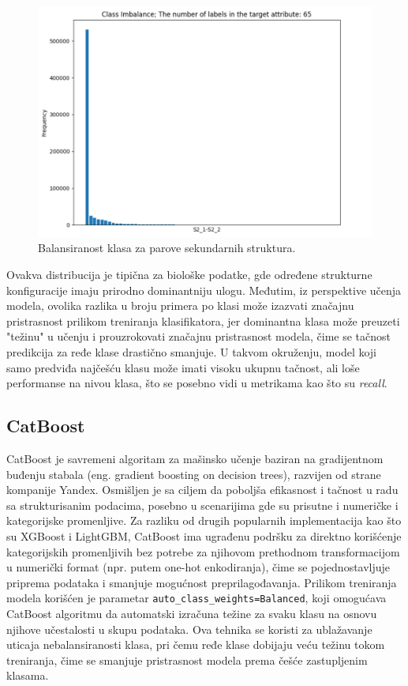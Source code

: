 \documentclass[a4paper,12pt]{article}
\begin{document}
\begin{figure}[htbp]
    \centering
    \includegraphics[width=1\textwidth]{./images/ss_imbalance.png}
    \caption{Balansiranost klasa za parove sekundarnih struktura.}
    \label{Slika:ss_imbalance}
\end{figure}
\newpage
Ovakva distribucija je tipična za biološke podatke, gde određene strukturne konfiguracije imaju prirodno dominantniju ulogu. Međutim, iz perspektive učenja modela, ovolika razlika u broju primera po klasi može izazvati značajnu pristrasnost prilikom treniranja klasifikatora, jer dominantna klasa može preuzeti "težinu" u učenju i prouzrokovati značajnu pristrasnost modela, čime se tačnost predikcija za ređe klase drastično smanjuje. U takvom okruženju, model koji samo predviđa najčešću klasu može imati visoku ukupnu tačnost, ali loše performanse na nivou klasa, što se posebno vidi u metrikama kao što su \textit{recall}.
\newpage

\subsection{CatBoost}

CatBoost je savremeni algoritam za mašinsko učenje baziran na gradijentnom buđenju stabala (eng. gradient boosting on decision trees), razvijen od strane kompanije Yandex. Osmišljen je sa ciljem da poboljša efikasnost i tačnost u radu sa strukturisanim podacima, posebno u scenarijima gde su prisutne i numeričke i kategorijske promenljive. Za razliku od drugih popularnih implementacija kao što su XGBoost i LightGBM, CatBoost ima ugrađenu podršku za direktno korišćenje kategorijskih promenljivih bez potrebe za njihovom prethodnom transformacijom u numerički format (npr. putem one-hot enkodiranja), čime se pojednostavljuje priprema podataka i smanjuje mogućnost preprilagođavanja.
Prilikom treniranja modela korišćen je parametar \texttt{auto\_class\_weights=\textquotesingle Balanced\textquotesingle}, koji omogućava CatBoost algoritmu da automatski izračuna težine za svaku klasu na osnovu njihove učestalosti u skupu podataka. Ova tehnika se koristi za ublažavanje uticaja nebalansiranosti klasa, pri čemu ređe klase dobijaju veću težinu tokom treniranja, čime se smanjuje pristrasnost modela prema češće zastupljenim klasama.
\end{document}
